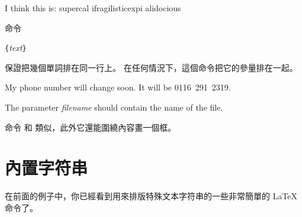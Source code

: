\begin{example}
I think this is: su\-per\-cal\-%
i\-frag\-i\-lis\-tic\-ex\-pi\-%
al\-i\-do\-cious
\end{example}

命令
\begin{lscommand}
\verb|{|\emph{text}\verb|}|
\end{lscommand}
\noindent 保證把幾個單詞排在同一行上。
在任何情況下，這個命令把它的參量排在一起。

\begin{example}
My phone number will change soon.
It will be \mbox{0116 291 2319}.

The parameter
\mbox{\emph{filename}} should
contain the name of the file.
\end{example}

命令  和  類似，此外它還能圍繞內容畫一個框。


\section{內置字符串}

在前面的例子中，你已經看到用來排版特殊文本字符串的一些非常簡單的 \LaTeX{} 命令了。

\vspace{2ex}

